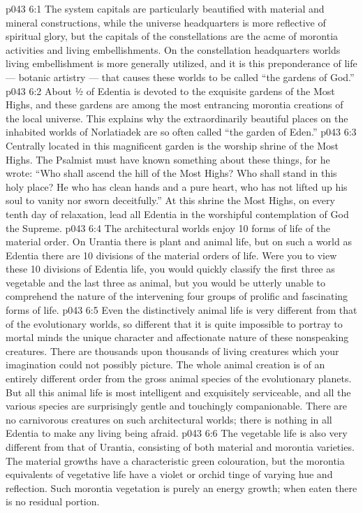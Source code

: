 \vs p043 6:1 The system capitals are particularly beautified with material and mineral constructions, while the universe headquarters is more reflective of spiritual glory, but the capitals of the constellations are the acme of morontia activities and living embellishments. On the constellation headquarters worlds living embellishment is more generally utilized, and it is this preponderance of life --- botanic artistry --- that causes these worlds to be called “the gardens of God.”
\vs p043 6:2 \pc About ½ of Edentia is devoted to the exquisite gardens of the Most Highs, and these gardens are among the most entrancing morontia creations of the local universe. This explains why the extraordinarily beautiful places on the inhabited worlds of Norlatiadek are so often called “the garden of Eden.”
\vs p043 6:3 Centrally located in this magnificent garden is the worship shrine of the Most Highs. The Psalmist must have known something about these things, for he wrote: “Who shall ascend the hill of the Most Highs? Who shall stand in this holy place? He who has clean hands and a pure heart, who has not lifted up his soul to vanity nor sworn deceitfully.” At this shrine the Most Highs, on every tenth day of relaxation, lead all Edentia in the worshipful contemplation of God the Supreme.
\vs p043 6:4 \pc The architectural worlds enjoy 10 forms of life of the material order. On Urantia there is plant and animal life, but on such a world as Edentia there are 10 divisions of the material orders of life. Were you to view these 10 divisions of Edentia life, you would quickly classify the first three as vegetable and the last three as animal, but you would be utterly unable to comprehend the nature of the intervening four groups of prolific and fascinating forms of life.
\vs p043 6:5 Even the distinctively animal life is very different from that of the evolutionary worlds, so different that it is quite impossible to portray to mortal minds the unique character and affectionate nature of these nonspeaking creatures. There are thousands upon thousands of living creatures which your imagination could not possibly picture. The whole animal creation is of an entirely different order from the gross animal species of the evolutionary planets. But all this animal life is most intelligent and exquisitely serviceable, and all the various species are surprisingly gentle and touchingly companionable. There are no carnivorous creatures on such architectural worlds; there is nothing in all Edentia to make any living being afraid.
\vs p043 6:6 The vegetable life is also very different from that of Urantia, consisting of both material and morontia varieties. The material growths have a characteristic green colouration, but the morontia equivalents of vegetative life have a violet or orchid tinge of varying hue and reflection. Such morontia vegetation is purely an energy growth; when eaten there is no residual portion.
